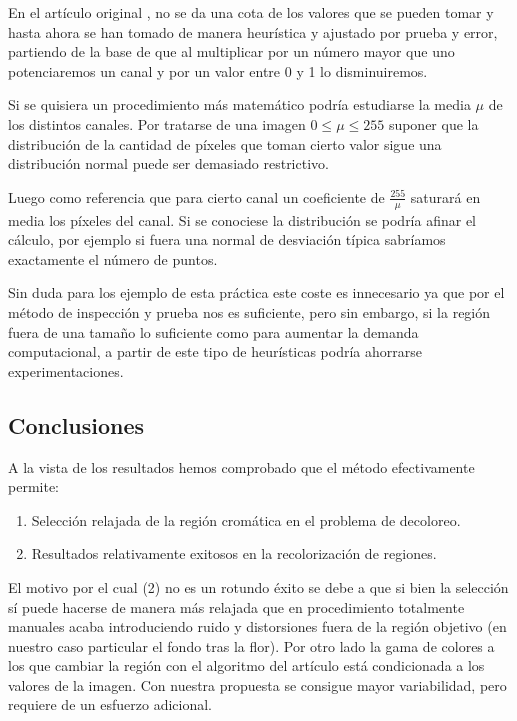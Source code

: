 \documentclass[11pt,twoside,titlepage,a4paper]{article}
\numberwithin{equation}{section} %
\theoremstyle{usual}
\begin{document}
En el artículo original \cite{poissonImageEditing}, no se da una cota de los valores que se pueden tomar y hasta ahora se han tomado de manera heurística y ajustado por prueba y error, partiendo de la base de que al multiplicar por un número mayor que uno potenciaremos un canal y por un valor entre 0 y 1 lo disminuiremos.   

Si se quisiera un procedimiento más matemático podría estudiarse la media $\mu$ de los distintos canales. 
Por tratarse de una imagen $0 \leq \mu \leq 255$ suponer que la distribución de la cantidad de píxeles que toman cierto valor sigue una distribución normal puede ser demasiado restrictivo.   

Luego como referencia que para cierto canal un coeficiente de $\frac{255}{\mu}$ saturará en media los píxeles del canal. Si se conociese la distribución se podría afinar el cálculo, por ejemplo si fuera una normal de desviación típica sabríamos exactamente el número de puntos.  

Sin duda para los ejemplo de esta práctica este coste es innecesario ya que por el método de inspección y prueba nos es suficiente, pero sin embargo, si la región fuera de una tamaño lo suficiente como para aumentar la demanda computacional, a partir de este tipo de heurísticas podría ahorrarse experimentaciones. 

\subsection{Conclusiones}

A la vista de los resultados hemos comprobado que el método efectivamente permite:

\begin{enumerate}
    \item Selección relajada de la región cromática en el problema de decoloreo. 
    \item Resultados relativamente exitosos en la recolorización de regiones.  
\end{enumerate}

El motivo por el cual (2) no es un rotundo éxito se debe a que si bien la selección sí puede hacerse de manera más relajada que en procedimiento totalmente manuales acaba introduciendo ruido y distorsiones fuera de la región objetivo (en nuestro caso particular el fondo tras la flor). Por otro lado la gama de colores a los que cambiar la región con el algoritmo del artículo \cite{poissonImageEditing} está condicionada a los valores de la imagen. Con nuestra propuesta se consigue mayor variabilidad, pero requiere de un esfuerzo adicional. 
\end{document}
